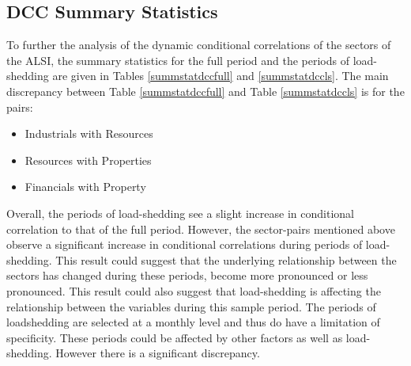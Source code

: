 \documentclass[11pt,preprint, authoryear]{elsarticle}
\numberwithin{equation}{section}
\numberwithin{figure}{section}
\numberwithin{table}{section}
\def\tightlist{} %
\begin{document}
\hypertarget{dcc-summary-statistics}{%
\subsection{DCC Summary Statistics}\label{dcc-summary-statistics}}

To further the analysis of the dynamic conditional correlations of the
sectors of the ALSI, the summary statistics for the full period and the
periods of load-shedding are given in Tables \ref{summstatdccfull} and
\ref{summstatdccls}. The main discrepancy between Table
\ref{summstatdccfull} and Table \ref{summstatdccls} is for the pairs:

\begin{itemize}
\tightlist
\item
  Industrials with Resources
\item
  Resources with Properties
\item
  Financials with Property
\end{itemize}

Overall, the periods of load-shedding see a slight increase in
conditional correlation to that of the full period. However, the
sector-pairs mentioned above observe a significant increase in
conditional correlations during periods of load-shedding. This result
could suggest that the underlying relationship between the sectors has
changed during these periods, become more pronounced or less pronounced.
This result could also suggest that load-shedding is affecting the
relationship between the variables during this sample period. The
periods of loadshedding are selected at a monthly level and thus do have
a limitation of specificity. These periods could be affected by other
factors as well as load-shedding. However there is a significant
discrepancy.
\end{document}
